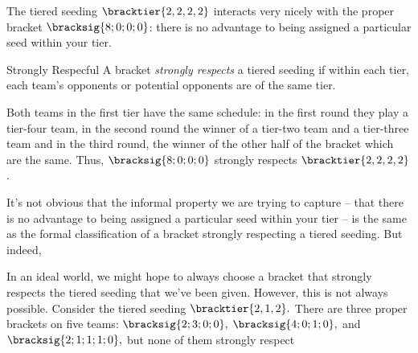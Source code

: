 {    The tiered seeding $\bracktier{2,2,2,2}$ interacts very nicely with the proper bracket $\bracksig{8;0;0;0}$: there is no advantage to being assigned a particular seed within your tier.

    \begin{definition}{Strongly Respecful}{}
        A bracket \textit{strongly respects} a tiered seeding if within each tier, each team's opponents or potential opponents are of the same tier. %
    \end{definition}

    Both teams in the first tier have the same schedule: in the first round they play a tier-four team, in the second round the winner of a tier-two team and a tier-three team and in the third round, the winner of the other half of the bracket which are the same. Thus, $\bracksig{8;0;0;0}$ strongly respects  $\bracktier{2,2,2,2}$.

    It's not obvious that the informal property we are trying to capture -- that there is no advantage to being assigned a particular seed within your tier -- is the same as the formal classification of a bracket strongly respecting a tiered seeding. But indeed,


    In an ideal world, we might hope to always choose a bracket that strongly respects the tiered seeding that we've been given. However, this is not always possible. Consider the tiered seeding $\bracktier{2,1,2}.$ 
    There are three proper brackets on five teams: $\bracksig{2;3;0;0},$ $\bracksig{4;0;1;0},$ and $\bracksig{2;1;1;1;0},$ but none of them strongly respect 


}









